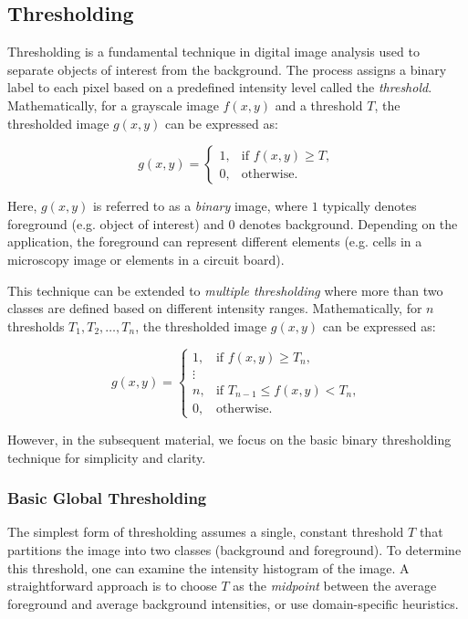 \documentclass[a4paper,12pt]{article}
\begin{document}
\subsection{Thresholding}

Thresholding is a fundamental technique in digital image analysis used to separate objects of interest from the background. The process assigns a binary label to each pixel based on a predefined intensity level called the \emph{threshold}. Mathematically, for a grayscale image \(f(x, y)\) and a threshold \(T\), the thresholded image \(g(x, y)\) can be expressed as:

\[
g(x, y) = 
\begin{cases}
1, & \text{if } f(x, y) \geq T, \\
0, & \text{otherwise}.
\end{cases}
\]

Here, \(g(x, y)\) is referred to as a \emph{binary} image, where \(1\) typically denotes foreground (e.g. object of interest) and \(0\) denotes background. Depending on the application, the foreground can represent different elements (e.g. cells in a microscopy image or elements in a circuit board).

This technique can be extended to \emph{multiple thresholding} where more than two classes are defined based on different intensity ranges. Mathematically, for \(n\) thresholds \(T_1, T_2, \ldots, T_n\), the thresholded image \(g(x, y)\) can be expressed as:

\[
g(x, y) =
\begin{cases}
1, & \text{if } f(x, y) \geq T_n, \\
\vdots & \\
n, & \text{if } T_{n-1} \leq f(x, y) < T_n, \\
0, & \text{otherwise}.
\end{cases}
\]

However, in the subsequent material, we focus on the basic binary thresholding technique for simplicity and clarity.

\subsubsection{Basic Global Thresholding}

The simplest form of thresholding assumes a single, constant threshold \(T\) that partitions the image into two classes (background and foreground). To determine this threshold, one can examine the intensity histogram of the image. A straightforward approach is to choose \(T\) as the \emph{midpoint} between the average foreground and average background intensities, or use domain-specific heuristics.
\end{document}
